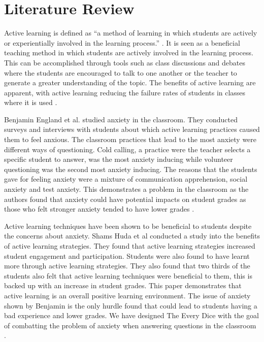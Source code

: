 \documentclass{sigchi}
\begin{document}
\section{Literature Review}

  Active learning is defined as “a method of learning in which students are actively or experientially involved in the learning process.” \cite{bonwell_eison_1991}. It is seen as a beneficial teaching method in which students are actively involved in the learning process. This can be accomplished through tools such as class discussions and debates where the students are encouraged to talk to one another or the teacher to generate a greater understanding of the topic. The benefits of active learning are apparent, with active learning reducing the failure rates of students in classes where it is used \cite{freeman_eddy_mcdonough_smith_okoroafor_jordt_wenderoth_2014}.  

  Benjamin England et al. studied anxiety in the classroom. They conducted surveys and interviews with students about which active learning practices caused them to feel anxious. The classroom practices that lead to the most anxiety were different ways of questioning. Cold calling, a practice were the teacher selects a specific student to answer, was the most anxiety inducing while volunteer questioning was the second most anxiety inducing. The reasons that the students gave for feeling anxiety were a mixture of communication apprehension, social anxiety and test anxiety. This demonstrates a problem in the classroom as the authors found that anxiety could have potential impacts on student grades as those who felt stronger anxiety tended to have lower grades \cite{england_brigati_schussler_2017}.

  Active learning techniques have been shown to be beneficial to students despite the concerns about anxiety. Shams Huda et al conducted a study into the benefits of active learning strategies. They found that active learning strategies increased student engagement and participation. Students were also found to have learnt more through active learning strategies. They also found that two thirds of the students also felt that active learning techniques were beneficial to them, this is backed up with an increase in student grades. This paper demonstrates that active learning is an overall positive learning environment. The issue of anxiety shown by Benjamin is the only hurdle found that could lead to students having a bad experience and lower grades. We have designed The Every Dice with the goal of combatting the problem of anxiety when answering questions in the classroom \cite{ul_huda_ali_nanji_cassum_2016}.
\end{document}

